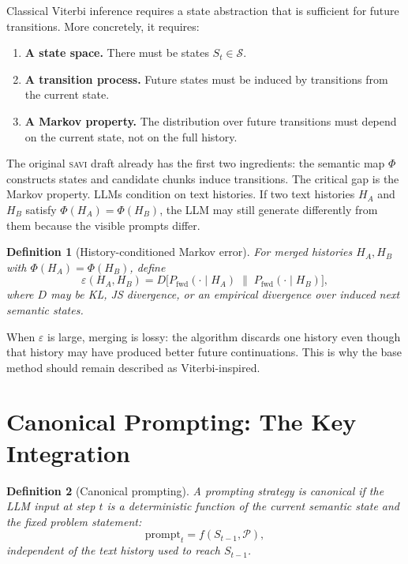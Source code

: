 \documentclass[11pt,letterpaper]{article}
\newtheorem{definition}{Definition}
\newcommand{\Phifn}{\Phi}
\newcommand{\Pfwd}{P_{\mathrm{fwd}}}
\newcommand{\calS}{\mathcal{S}}
\newcommand{\calP}{\mathcal{P}}
\newcommand{\SAVI}{\textsc{savi}\xspace}
\newcommand{\eps}{\varepsilon}
\begin{document}
Classical Viterbi inference requires a state abstraction that is sufficient for future transitions.
More concretely, it requires:

\begin{enumerate}[label=(\roman*)]
  \item \textbf{A state space.} There must be states $S_t \in \calS$.
  \item \textbf{A transition process.} Future states must be induced by transitions from the current
        state.
  \item \textbf{A Markov property.} The distribution over future transitions must depend on the
        current state, not on the full history.
\end{enumerate}

The original \SAVI draft already has the first two ingredients: the semantic map $\Phifn$ constructs
states and candidate chunks induce transitions.
The critical gap is the Markov property.
LLMs condition on text histories.
If two text histories $H_A$ and $H_B$ satisfy $\Phifn(H_A) = \Phifn(H_B)$, the LLM may still
generate differently from them because the visible prompts differ.

\begin{definition}[History-conditioned Markov error]
For merged histories $H_A, H_B$ with $\Phifn(H_A) = \Phifn(H_B)$, define
\[
  \eps(H_A, H_B) = D\bigl[\Pfwd(\cdot \mid H_A) \;\|\; \Pfwd(\cdot \mid H_B)\bigr],
\]
where $D$ may be KL, JS divergence, or an empirical divergence over induced next semantic states.
\end{definition}

When $\eps$ is large, merging is lossy: the algorithm discards one history even though that history
may have produced better future continuations.
This is why the base method should remain described as Viterbi-inspired.

\section{Canonical Prompting: The Key Integration}

\begin{definition}[Canonical prompting]
A prompting strategy is \emph{canonical} if the LLM input at step $t$ is a deterministic function of
the current semantic state and the fixed problem statement:
\[
  \mathrm{prompt}_t = f(S_{t-1}, \calP),
\]
independent of the text history used to reach $S_{t-1}$.
\end{definition}
\end{document}
